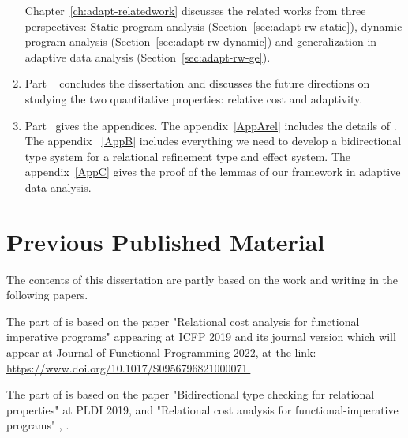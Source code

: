 \begin{enumerate}
Chapter~\ref{ch:adapt-relatedwork} discusses the related works from three perspectives: Static program analysis (Section~\ref{sec:adapt-rw-static}), dynamic program analysis (Section~\ref{sec:adapt-rw-dynamic}) and generalization in adaptive data analysis (Section~\ref{sec:adapt-rw-ge}).  
\item Part  ~ concludes the dissertation and discusses the future directions on studying the two quantitative properties: relative cost and adaptivity.
\item Part  ~gives the appendices. The appendix~\ref{AppArel} includes the details of {\Arel}. The appendix ~\ref{AppB} includes everything we need to develop a bidirectional type system for a relational refinement type and effect system. The appendix~\ref{AppC} gives the proof of the lemmas of our framework in adaptive data analysis.    
\end{enumerate}



\section{Previous Published Material}
The contents of this dissertation are partly based on the work and writing in the following papers.

The part of {\Arel} is based on the paper "Relational cost analysis for functional imperative programs" \citep{qu2019relational} appearing at ICFP 2019 and its journal version which will appear at Journal of Functional Programming 2022, at the link:\\ \hyperlink{link}{https://www.doi.org/10.1017/S0956796821000071. } 

The part of {\BIAREL} is based on the paper "Bidirectional type checking for relational properties" \citep{birelcost} at PLDI 2019, and "Relational cost analysis for functional-imperative programs" \citep{qu2019relational}, .




